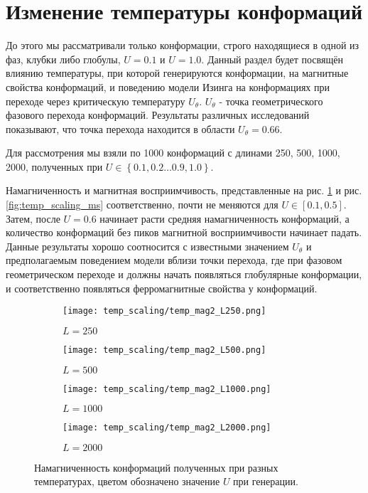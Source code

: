 \section{Изменение температуры конформаций}
До этого мы рассматривали только конформации, строго находящиеся в одной из фаз, клубки либо глобулы, $U = 0.1$ и $U = 1.0$. Данный раздел будет посвящён влиянию температуры, при которой генерируются конформации, на магнитные свойства конформаций, и поведению модели Изинга на конформациях при переходе через критическую температуру $U_\theta$. $U_\theta$ - точка геометрического фазового перехода конформаций. Результаты различных исследований \cite{SAW_tetta_point} показывают, что точка перехода находится в области $U_\theta = 0.66$. 

Для рассмотрения мы взяли по 1000 конформаций с длинами 250, 500, 1000, 2000, полученных при $U \in \left\{0.1, 0.2 \dots 0.9, 1.0\right\}$.

Намагниченность и магнитная восприимчивость, представленные на рис. \ref{fig:temp_scaling_mag2} и рис. \ref{fig:temp_scaling_ms} соответственно, почти не меняются для $U \in \left[0.1, 0.5\right]$. Затем, после $U=0.6$ начинает расти средняя намагниченность конформаций, а количество конформаций без пиков магнитной восприимчивости начинает падать.
Данные результаты хорошо соотносится с известными значением $U_\theta$ и предполагаемым поведением модели вблизи точки перехода, где при фазовом геометрическом переходе и должны начать появляться глобулярные конформации, и соответственно появляться ферромагнитные свойства у конформаций. 



\begin{figure}[ht]
	\centering
    \begin{subfigure}[t]{0.4\textwidth}
        \texttt{[image: temp\_scaling/temp\_mag2\_L250.png]}
        \caption*{$L = 250$}
    \end{subfigure} 
    \begin{subfigure}[t]{0.4\textwidth}
        \texttt{[image: temp\_scaling/temp\_mag2\_L500.png]}
        \caption*{$L = 500$}

    \end{subfigure}
    \begin{subfigure}[t]{0.4\textwidth}
        \texttt{[image: temp\_scaling/temp\_mag2\_L1000.png]}
        \caption*{$L = 1000$}
    \end{subfigure}
    \begin{subfigure}[t]{0.4\textwidth}
        \texttt{[image: temp\_scaling/temp\_mag2\_L2000.png]}
        \caption*{$L = 2000$}
    \end{subfigure}
	\caption{Намагниченность конформаций полученных при разных температурах, цветом обозначено значение $U$ при генерации.}
	\label{fig:temp_scaling_mag2}
\end{figure}


